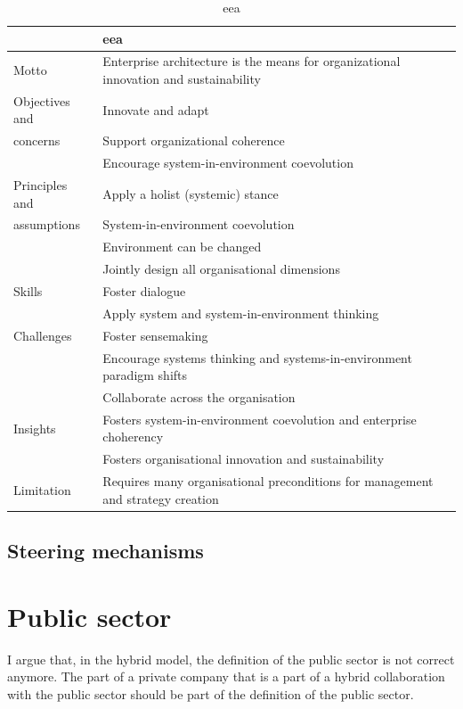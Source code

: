 \begin{longtable}{p{}p{}}
	\toprule
	& \textbf{\acrlong{eea}} \\ \midrule%
	\endhead%
	\hline
	\caption{\acrlong{eea}}
	\label{tab:eaeea}	
	\endfoot%
	Motto    		& Enterprise architecture is the means for organizational innovation and sustainability \\
	Objectives and 	& Innovate and adapt    \\
	concerns		& Support organizational coherence \\
					& Encourage system-in-environment coevolution \\
	Principles and  & Apply a holist (systemic) stance \\
	assumptions		& System-in-environment coevolution  \\
					& Environment can be changed \\
					& Jointly design all organisational dimensions \\
	Skills 			& Foster dialogue \\
					& Apply system and system-in-environment thinking \\
	Challenges		& Foster sensemaking \\
					& Encourage systems thinking and systems-in-environment paradigm shifts \\
					& Collaborate across the organisation \\
	Insights		& Fosters system-in-environment coevolution and enterprise choherency \\
					& Fosters organisational innovation and sustainability \\
	Limitation		& Requires many organisational preconditions for management and strategy creation \\
	\bottomrule
\end{longtable}

\subsection{Steering mechanisms}
\label{sub:tbeasteering}

\section{Public sector}
\label{sec:tbpsmarket}
I argue that, in the hybrid model, the definition of the public sector is not correct anymore. The part of a private company that is a part of a hybrid collaboration with the public sector should be part of the definition of the public sector.

